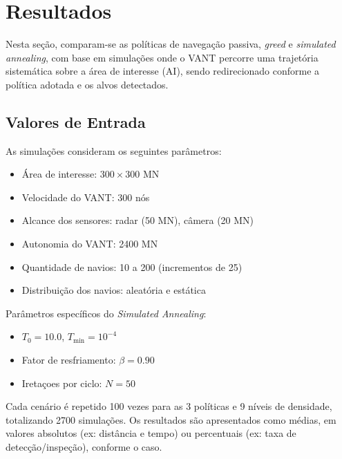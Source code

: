 \section{Resultados}

Nesta seção, comparam-se as políticas de navegação passiva, \textit{greed} e \textit{simulated annealing}, com base em simulações onde o VANT percorre uma trajetória sistemática sobre a área de interesse (AI), sendo redirecionado conforme a política adotada e os alvos detectados.

\subsection{Valores de Entrada}

As simulações consideram os seguintes parâmetros:

\begin{itemize}
    \item Área de interesse: $300 \times 300$ MN
    \item Velocidade do VANT: 300 nós
    \item Alcance dos sensores: radar (50 MN), câmera (20 MN)
    \item Autonomia do VANT: 2400 MN
    \item Quantidade de navios: 10 a 200 (incrementos de 25)
    \item Distribuição dos navios: aleatória e estática
\end{itemize}

Parâmetros específicos do \textit{Simulated Annealing}:

\begin{itemize}
    \item $T_0 = 10.0$, $T_{\text{min}} = 10^{-4}$
    \item Fator de resfriamento: $\beta = 0.90$
    \item Iretaçoes por ciclo: $N=50$
\end{itemize}

Cada cenário é repetido 100 vezes para as 3 políticas e 9 níveis de densidade, totalizando 2700 simulações. Os resultados são apresentados como médias, em valores absolutos (ex: distância e tempo) ou percentuais (ex: taxa de detecção/inspeção), conforme o caso.


